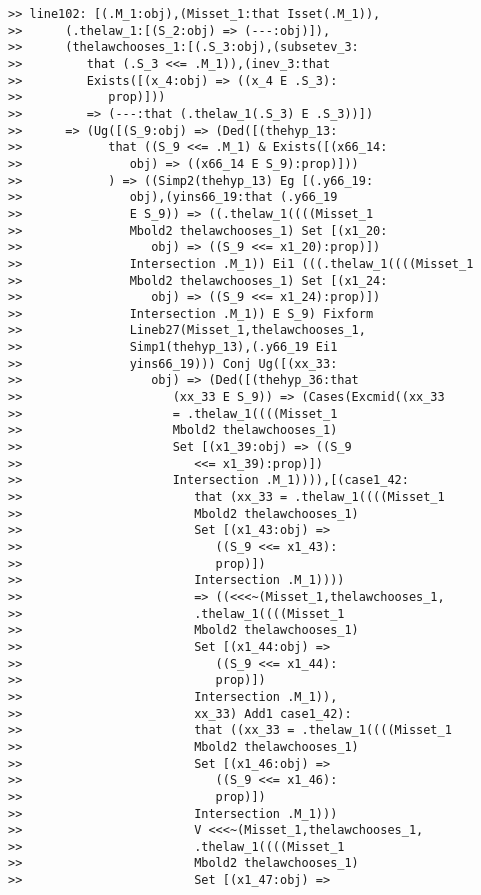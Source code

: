 \documentclass[12pt]{article}
\begin{document}
\begin{verbatim}
>> line102: [(.M_1:obj),(Misset_1:that Isset(.M_1)),
>>      (.thelaw_1:[(S_2:obj) => (---:obj)]),
>>      (thelawchooses_1:[(.S_3:obj),(subsetev_3:
>>         that (.S_3 <<= .M_1)),(inev_3:that
>>         Exists([(x_4:obj) => ((x_4 E .S_3):
>>            prop)]))
>>         => (---:that (.thelaw_1(.S_3) E .S_3))])
>>      => (Ug([(S_9:obj) => (Ded([(thehyp_13:
>>            that ((S_9 <<= .M_1) & Exists([(x66_14:
>>               obj) => ((x66_14 E S_9):prop)]))
>>            ) => ((Simp2(thehyp_13) Eg [(.y66_19:
>>               obj),(yins66_19:that (.y66_19
>>               E S_9)) => ((.thelaw_1((((Misset_1
>>               Mbold2 thelawchooses_1) Set [(x1_20:
>>                  obj) => ((S_9 <<= x1_20):prop)])
>>               Intersection .M_1)) Ei1 (((.thelaw_1((((Misset_1
>>               Mbold2 thelawchooses_1) Set [(x1_24:
>>                  obj) => ((S_9 <<= x1_24):prop)])
>>               Intersection .M_1)) E S_9) Fixform
>>               Lineb27(Misset_1,thelawchooses_1,
>>               Simp1(thehyp_13),(.y66_19 Ei1
>>               yins66_19))) Conj Ug([(xx_33:
>>                  obj) => (Ded([(thehyp_36:that
>>                     (xx_33 E S_9)) => (Cases(Excmid((xx_33
>>                     = .thelaw_1((((Misset_1
>>                     Mbold2 thelawchooses_1)
>>                     Set [(x1_39:obj) => ((S_9
>>                        <<= x1_39):prop)])
>>                     Intersection .M_1)))),[(case1_42:
>>                        that (xx_33 = .thelaw_1((((Misset_1
>>                        Mbold2 thelawchooses_1)
>>                        Set [(x1_43:obj) =>
>>                           ((S_9 <<= x1_43):
>>                           prop)])
>>                        Intersection .M_1))))
>>                        => ((<<<~(Misset_1,thelawchooses_1,
>>                        .thelaw_1((((Misset_1
>>                        Mbold2 thelawchooses_1)
>>                        Set [(x1_44:obj) =>
>>                           ((S_9 <<= x1_44):
>>                           prop)])
>>                        Intersection .M_1)),
>>                        xx_33) Add1 case1_42):
>>                        that ((xx_33 = .thelaw_1((((Misset_1
>>                        Mbold2 thelawchooses_1)
>>                        Set [(x1_46:obj) =>
>>                           ((S_9 <<= x1_46):
>>                           prop)])
>>                        Intersection .M_1)))
>>                        V <<<~(Misset_1,thelawchooses_1,
>>                        .thelaw_1((((Misset_1
>>                        Mbold2 thelawchooses_1)
>>                        Set [(x1_47:obj) =>

\end{verbatim}
\end{document}
